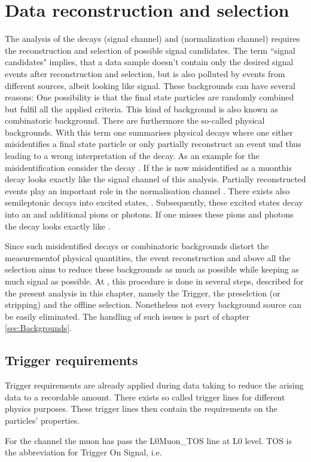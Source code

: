 \chapter{Data reconstruction and selection}
\label{sec:Selection}

The analysis of the decays \LbToDpmunuX (signal channel)  and \LbToLcmunu (normalization channel) requires the reconstruction and selection of possible signal candidates.
The term ``signal candidates" implies, that a data sample doesn't contain only the desired signal events after reconstruction and selection, but is also polluted by events from different sources, albeit looking like signal.
These backgrounds can have several reasons: 
One possibility is that the final state particles are randomly combined but fulfil all the applied criteria. 
This kind of background is also known as combinatoric background.
There are furthermore the so-called physical backgrounds.
With this term one summarises physical decays where one either misidentifies a final state particle or only partially reconstruct an event und thus leading to a wrong interpretation of the decay.
As an example for the misidentification consider the decay \decay{\Lb}{\Dz\proton\pim}. If the \pim is now misidentified as a muonthis decay looks exactly like the signal channel of this analysis.
Partially reconstructed events play an important role in the normalisation channel \LbToLcmunu.
There exists also semileptonic \Lb decays into excited \Lcstar states, \decay{\Lb}{\Lcstar\mun\neumb}.
Subsequently, these excited \Lcstar states decay into an \Lc and additional pions or photons.
If one misses these pions and photons the decay looks exactly like \LbToLcmunu.

Since such misidentified decays or combinatoric backgrounds distort the measurementof physical quantities, the event reconstruction and above all the selection aims to reduce these backgrounds as much as possible while keeping as much signal as possible.
At \lhcb, this procedure is done in several steps, described for the present analysis in this chapter, namely the Trigger, the preselction (or stripping) and the offline selection. 
Nonetheless not every background source can be easily eliminated. 
The handling of such issues is part of chapter \ref{sec:Backgrounds}.

\section{Trigger requirements}
Trigger requirements are already applied during data taking to reduce the arising data to a recordable amount.
There exists so called trigger lines for different physics purposes. 
These trigger lines then contain the requirements on the particles' properties.

For the \LbToDpmunuX channel the muon has pass the L0Muon\_TOS line at L0 level. TOS is the abbreviation for Trigger On Signal, i.e. 
